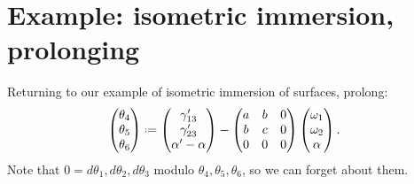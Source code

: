 \section{Example: isometric immersion, prolonging}
Returning to our example of isometric immersion of surfaces, prolong:
\begin{align*}
\begin{pmatrix}
  \theta_4 \\
  \theta_5 \\
  \theta_6 
\end{pmatrix}
&\defeq 
\begin{pmatrix}
\qc_{13} \\
\qc_{23} \\
\otalpha-\alpha
\end{pmatrix}
-
\begin{pmatrix}
a & b & 0 \\
b & c & 0 \\
0 & 0 & 0
\end{pmatrix}
\begin{pmatrix}
\pf_1 \\
\pf_2 \\
\alpha
\end{pmatrix}.
\end{align*}
Note that \(0=d\theta_1, d\theta_2, d\theta_3\) modulo \(\theta_4,\theta_5,\theta_6\), so we can forget about them.


